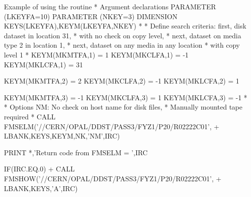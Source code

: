 \begin{XMPt}{Example of using the \protect{} routine}
*     Argument declarations
      PARAMETER (LKEYFA=10)
      PARAMETER (NKEY=3)
      DIMENSION KEYS(LKEYFA),KEYM(LKEYFA,NKEY)
*
*     Define search criteria: first, disk dataset in location 31,
*        with no check on copy level,
*                             next, dataset on media type 2 in location 1,
*                             next, dataset on any media in any location 
*                             with copy level 1
*
      KEYM(MKMTFA,1) = 1
      KEYM(MKCLFA,1) = -1
      KEYM(MKLCFA,1) = 31

      KEYM(MKMTFA,2) = 2
      KEYM(MKCLFA,2) = -1
      KEYM(MKLCFA,2) = 1

      KEYM(MKMTFA,3) = -1
      KEYM(MKCLFA,3) = 1
      KEYM(MKLCFA,3) = -1
*
*     Options NM: No check on host name for disk files,
*                 Manually mounted tape required
*
      CALL FMSELM('//CERN/OPAL/DDST/PASS3/FYZ1/P20/R02222C01',
     +   LBANK,KEYS,KEYM,NK,'NM',IRC)

      PRINT *,'Return code from FMSELM = ',IRC

      IF(IRC.EQ.0)
     +   CALL FMSHOW('//CERN/OPAL/DDST/PASS3/FYZ1/P20/R02222C01',
     +                LBANK,KEYS,'A',IRC)


\end{XMPt}
